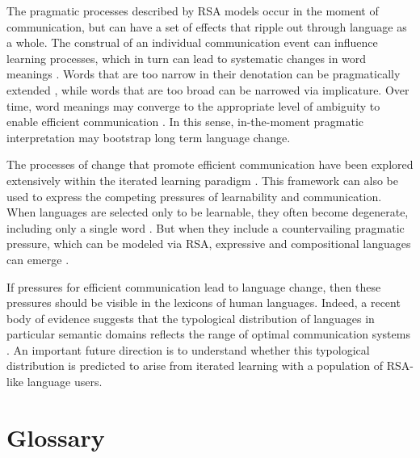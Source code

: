\documentclass[]{elsarticle}
\begin{document}
The pragmatic processes described by RSA models occur in the moment of
communication, but can have a set of effects that ripple out through
language as a whole. The construal of an individual communication event
can influence learning processes, which in turn can lead to
systematic changes in word meanings \citep{smith2013}.
Words that are too narrow in their denotation can be pragmatically
extended \citep{kao2014}, while words that are too
broad can be narrowed via implicature. Over time, word meanings may
converge to the appropriate level of ambiguity to enable efficient
communication \citep{piantadosi2012}.
In this sense, in-the-moment pragmatic interpretation may bootstrap long term language change.

The processes of change that promote efficient communication have been
explored extensively within the iterated learning paradigm \citep{kirby2008}. 
This framework can also be used to express the competing pressures of
learnability and communication. When languages are selected only to be
learnable, they often become degenerate, including only a single word
\citep{perfors2014}. But when they include a countervailing
pragmatic pressure, which can be modeled via RSA, expressive and compositional languages can emerge
\citep{kirby2015}.

If pressures for efficient communication lead to language change, then
these pressures should be visible in the lexicons of human languages. Indeed, a
recent body of evidence suggests that the typological distribution of languages in particular
semantic domains reflects the range of optimal communication systems
\citep[e.g.,][]{regier2007,kemp2012,xu2014}.
An important future direction is to understand whether this typological distribution is predicted to arise from iterated learning with a population of RSA-like language users.


\section{Glossary}\label{glossary}
\end{document}
